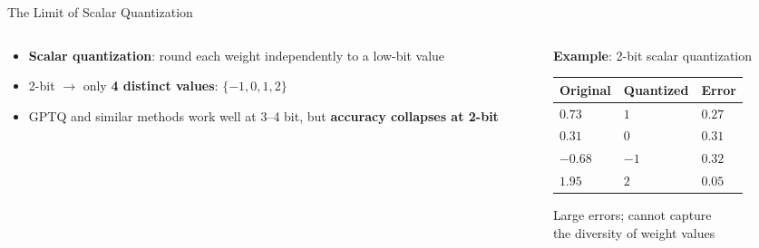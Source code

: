 \begin{frame}{The Limit of Scalar Quantization}
  \begin{columns}[T]
    \begin{column}{0.55\textwidth}
      \begin{itemize}
        \item \textbf{Scalar quantization}: round each weight independently to a low-bit value
        \vspace{0.5em}
        \item 2-bit $\rightarrow$ only \textbf{4 distinct values}: $\{-1, 0, 1, 2\}$
        \vspace{0.5em}
        \item GPTQ and similar methods work well at 3--4 bit, but \textbf{accuracy collapses at 2-bit}
      \end{itemize}
    \end{column}
    \begin{column}{0.42\textwidth}
      \vspace{0.5em}
      \textbf{Example}: 2-bit scalar quantization

      \vspace{0.4em}
      \begin{tabular}{lll}
        \toprule
        Original & Quantized & Error \\
        \midrule
        $0.73$ & $1$ & $0.27$ \\
        $0.31$ & $0$ & $0.31$ \\
        $-0.68$ & $-1$ & $0.32$ \\
        $1.95$ & $2$ & $0.05$ \\
        \bottomrule
      \end{tabular}

      \vspace{0.5em}
      \small Large errors; cannot capture\\the diversity of weight values
    \end{column}
  \end{columns}
\end{frame}

